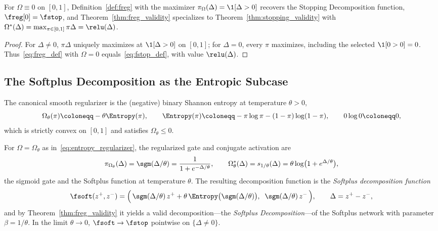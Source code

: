 \begin{corollary}\label{cor:freg_stop}
For $\Omega \equiv 0$ on $[0,1]$, Definition~\ref{def:freg} with the maximizer $\pi_\Omega(\Delta) = \1[\Delta > 0]$ recovers the Stopping Decomposition function, $\freg[0] = \fstop$, and Theorem~\ref{thm:freg_validity} specializes to Theorem~\ref{thm:stopping_validity} with $\Omega^*(\Delta) = \max_{\pi \in [0,1]} \pi\Delta = \relu(\Delta)$.\end{corollary}

\begin{proof}
For $\Delta\neq0$, $\pi\Delta$ uniquely maximizes at $\1[\Delta>0]$ on $[0,1]$; for $\Delta=0$, every $\pi$ maximizes, including the selected $\1[0>0]=0$. Thus~\eqref{eq:freg_def} with $\Omega=0$ equals~\eqref{eq:fstop_def}, with value $\relu(\Delta)$.
\end{proof}

\subsection{The Softplus Decomposition as the Entropic Subcase}\label{subsec:softplus_decomposition}

The canonical smooth regularizer is the (negative) binary Shannon entropy at temperature $\theta > 0$,
\begin{equation}
	\Omega_\theta(\pi) \coloneqq -\theta \Entropy(\pi),
	\qquad
	\Entropy(\pi) \coloneqq -\pi \log \pi - (1 - \pi) \log(1 - \pi),\qquad 0\log0\coloneqq0,
	\label{eq:entropy_regularizer}
\end{equation}
which is strictly convex on $[0,1]$ and satisfies $\Omega_\theta \le 0$.

\begin{corollary}\label{cor:fsoft}
For $\Omega = \Omega_\theta$ as in~\eqref{eq:entropy_regularizer}, the regularized gate and conjugate activation are
\begin{equation}
	\pi_{\Omega_\theta}(\Delta) = \sgm(\Delta/\theta) = \frac{1}{1 + e^{-\Delta/\theta}},
	\qquad
	\Omega_\theta^*(\Delta) = s_{1/\theta}(\Delta) = \theta \log\bigl( 1 + e^{\Delta/\theta} \bigr),
	\label{eq:sigmoid_gate}
\end{equation}
the sigmoid gate and the Softplus function at temperature $\theta$. The resulting decomposition function is the \emph{Softplus decomposition function}
\begin{equation}
	\fsoft(z^+, z^-) = \Bigl(\, \sgm(\Delta/\theta)\, z^+ + \theta\, \Entropy\bigl(\sgm(\Delta/\theta)\bigr), \;\; \sgm(\Delta/\theta)\, z^- \,\Bigr),
	\qquad
	\Delta = z^+ - z^-,
	\label{eq:fsoft_def}
\end{equation}
and by Theorem~\ref{thm:freg_validity} it yields a valid decomposition---the \emph{Softplus Decomposition}---of the Softplus network with parameter $\beta = 1/\theta$. In the limit $\theta \to 0$, $\fsoft \to \fstop$ pointwise on $\{\Delta \neq 0\}$.\end{corollary}

